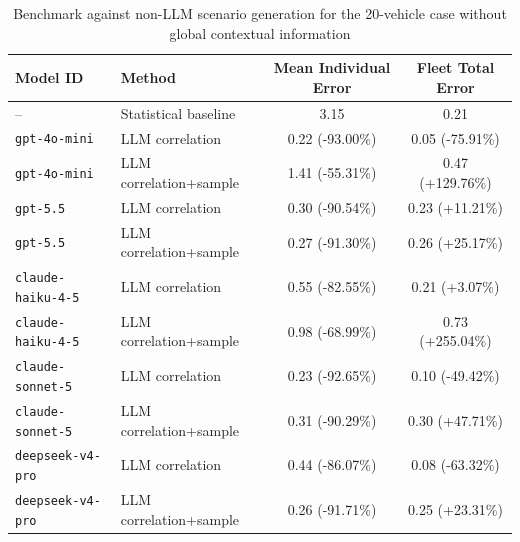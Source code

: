 \begin{table}[ht]
\centering
\caption{Benchmark against non-LLM scenario generation for the 20-vehicle case without global contextual information}
\label{tab:llm-api-benchmark-no-global}
\begin{tabular}{l l c c}
\hline
\textbf{Model ID} & \textbf{Method} & \textbf{Mean Individual Error} & \textbf{Fleet Total Error} \\
\hline
-- & Statistical baseline & 3.15 & 0.21 \\
\hline
\texttt{gpt-4o-mini} & LLM correlation & 0.22 (-93.00\%) & 0.05 (-75.91\%) \\
\texttt{gpt-4o-mini} & LLM correlation+sample & 1.41 (-55.31\%) & 0.47 (+129.76\%) \\
\hline
\texttt{gpt-5.5} & LLM correlation & 0.30 (-90.54\%) & 0.23 (+11.21\%) \\
\texttt{gpt-5.5} & LLM correlation+sample & 0.27 (-91.30\%) & 0.26 (+25.17\%) \\
\hline
\texttt{claude-haiku-4-5} & LLM correlation & 0.55 (-82.55\%) & 0.21 (+3.07\%) \\
\texttt{claude-haiku-4-5} & LLM correlation+sample & 0.98 (-68.99\%) & 0.73 (+255.04\%) \\
\hline
\texttt{claude-sonnet-5} & LLM correlation & 0.23 (-92.65\%) & 0.10 (-49.42\%) \\
\texttt{claude-sonnet-5} & LLM correlation+sample & 0.31 (-90.29\%) & 0.30 (+47.71\%) \\
\hline
\texttt{deepseek-v4-pro} & LLM correlation & 0.44 (-86.07\%) & 0.08 (-63.32\%) \\
\texttt{deepseek-v4-pro} & LLM correlation+sample & 0.26 (-91.71\%) & 0.25 (+23.31\%) \\
\hline
\end{tabular}
\end{table}
